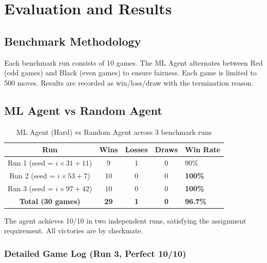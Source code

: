 \documentclass[a4paper,12pt]{article}
\begin{document}

\section{Evaluation and Results}

\subsection{Benchmark Methodology}

Each benchmark run consists of 10 games. The ML Agent alternates between Red (odd games) and Black (even games) to ensure fairness. Each game is limited to 500 moves. Results are recorded as win/loss/draw with the termination reason.

\subsection{ML Agent vs Random Agent}

\begin{table}[H]
\centering
\caption{ML Agent (Hard) vs Random Agent across 3 benchmark runs}
\begin{tabular}{@{}ccccl@{}}
\toprule
\textbf{Run} & \textbf{Wins} & \textbf{Losses} & \textbf{Draws} & \textbf{Win Rate} \\
\midrule
Run 1 (seed = $i \times 31 + 11$) & 9 & 1 & 0 & 90\% \\
Run 2 (seed = $i \times 53 + 7$) & 10 & 0 & 0 & \textbf{100\%} \\
Run 3 (seed = $i \times 97 + 42$) & 10 & 0 & 0 & \textbf{100\%} \\
\midrule
\textbf{Total (30 games)} & \textbf{29} & \textbf{1} & \textbf{0} & \textbf{96.7\%} \\
\bottomrule
\end{tabular}
\end{table}

The agent achieves 10/10 in two independent runs, satisfying the assignment requirement. All victories are by checkmate.

\subsubsection{Detailed Game Log (Run 3, Perfect 10/10)}
\end{document}
